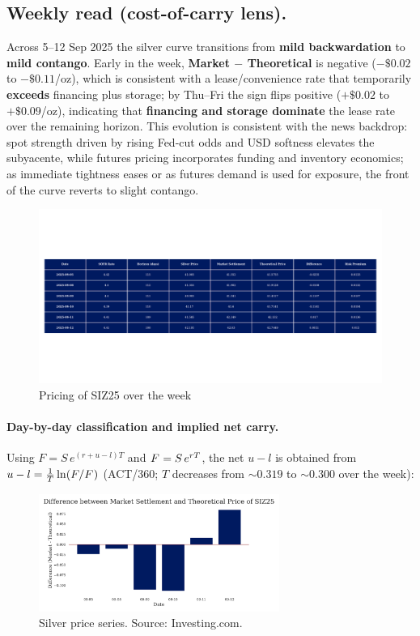 \documentclass[10pt,a4paper]{article} %
\begin{document}
\subsection{Weekly read (cost-of-carry lens).}
Across 5--12 Sep 2025 the silver curve transitions from \textbf{mild backwardation} to \textbf{mild contango}. Early in the week, \textbf{Market $-$ Theoretical} is negative ($-\$0.02$ to $-\$0.11$/oz), which is consistent with a lease/convenience rate that temporarily \textbf{exceeds} financing plus storage; by Thu--Fri the sign flips positive ($+\$0.02$ to $+\$0.09$/oz), indicating that \textbf{financing and storage dominate} the lease rate over the remaining horizon. This evolution is consistent with the news backdrop: spot strength driven by rising Fed-cut odds and USD softness elevates the subyacente, while futures pricing incorporates funding and inventory economics; as immediate tightness eases or as futures demand is used for exposure, the front of the curve reverts to slight contango.

\begin{figure}[h]
\centering
\includegraphics[width=1\textwidth]{figures/silver_pricing_over_the_week.pdf}
\caption{Pricing of SIZ25 over the week}
\end{figure}

\paragraph{Day-by-day classification and implied net carry.}
Using $F=S\,e^{(r+u-l)T}$ and $F^{\*}=S\,e^{rT}$, the net $u-l$ is obtained from $u-l=\tfrac{1}{T}\ln(F/F^{\*})$ (ACT/360; $T$ decreases from $\sim0.319$ to $\sim0.300$ over the week):

\begin{figure}[h]
\centering
\includegraphics[width=0.7\textwidth]{figures/silver_difference.pdf}
\caption{Silver price series. Source: Investing.com.}
\end{figure}
\end{document}
